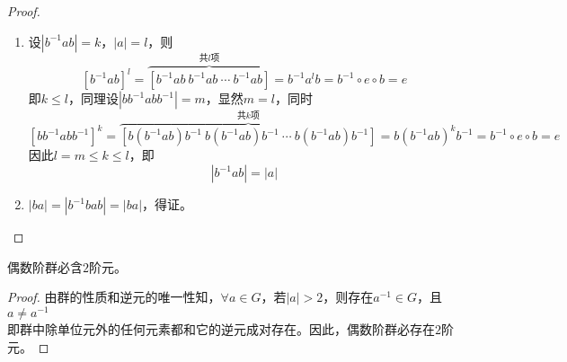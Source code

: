 \begin{proof}

    \begin{enumerate}

        \item 
            设$|b^{-1}ab| = k$，$|a| = l$，则
            $$[b^{-1}ab]^l = \overbrace{[b^{-1}ab \  b^{-1}ab \ \cdots \  b^{-1}ab]}^{共l项} = b^{-1}a^{l}b = b^{-1}\circ e \circ b = e$$
            即$k \leq l$，同理设$|bb^{-1}abb^{-1}| = m$，显然$m = l$，同时
            $$[bb^{-1}abb^{-1}]^k = \overbrace{[b(b^{-1}ab)b^{-1} \  b(b^{-1}ab)b^{-1} \ \cdots \  b(b^{-1}ab)b^{-1}]}^{共k项} = b(b^{-1}ab)^kb^{-1} = b^{-1}\circ e \circ b = e$$
            因此$l = m \leq k \leq l$，即
            $$|b^{-1}ab| = |a|$$
            
        \item 
            $|ba| = |b^{-1}bab| = |ba|$，得证。
        
    \end{enumerate}

\end{proof}

\begin{proposition}

    偶数阶群必含$2$阶元。

\end{proposition}

\begin{proof}

    由群的性质和逆元的唯一性知，$\forall a \in G$，若$|a| > 2$，则存在$a^{-1} \in G$，且$a \neq a^{-1}$\\
    即群中除单位元外的任何元素都和它的逆元成对存在。因此，偶数阶群必存在$2$阶元。

\end{proof}
